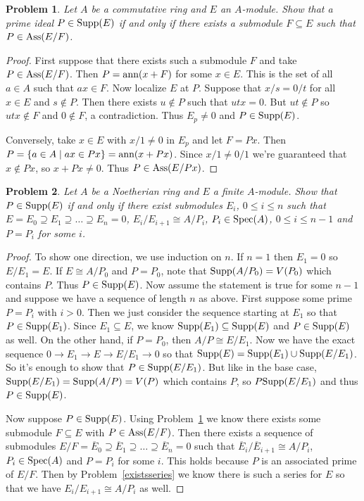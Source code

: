 \documentclass{article}
\newcommand{\ass}{\textup{Ass}}
\newcommand{\supp}{\textup{Supp}}
\newcommand{\ann}{\textup{ann}}
\newcommand{\spec}{\textup{Spec}}
\newtheorem{problem}{Problem}
\begin{document}
\begin{problem}
\label{existssub}
Let $A$ be a commutative ring and $E$ an $A$-module. Show that a prime ideal $P \in \supp(E)$ if and only if there exists a submodule $F \subseteq E$ such that $P \in \ass(E/F)$.
\end{problem}
\begin{proof}
First suppose that there exists such a submodule $F$ and take $P \in \ass(E/F)$. Then $P = \ann(x + F)$ for some $x \in E$. This is the set of all $a \in A$ such that $ax \in F$. Now localize $E$ at $P$. Suppose that $x/s = 0/t$ for all $x \in E$ and $s \notin P$. Then there exists $u \notin P$ such that $utx = 0$. But $ut \notin P$ so $utx \notin F$ and $0 \notin F$, a contradiction. Thus $E_p \neq 0$ and $P \in \supp(E)$.

Conversely, take $x \in E$ with $x/1 \neq 0$ in $E_p$ and let $F = Px$. Then $P = \{a \in A \mid ax \in Px\} = \ann(x + Px)$. Since $x/1 \neq 0/1$ we're guaranteed that $x \notin Px$, so $x + Px \neq 0$. Thus $P \in \ass(E/Px)$.
\end{proof}

\begin{problem}
Let $A$ be a Noetherian ring and $E$ a finite $A$-module. Show that $P \in \supp(E)$ if and only if there exist submodules $E_i$, $0 \leq i \leq n$ such that $E = E_0 \supseteq E_1 \supseteq \dots \supseteq E_n = 0$, $E_i/E_{i+1} \cong A/P_i$, $P_i \in \spec(A)$, $0 \leq i \leq n-1$ and $P = P_i$ for some $i$.
\end{problem}
\begin{proof}
To show one direction, we use induction on $n$. If $n = 1$ then $E_1 = 0$ so $E/E_1 = E$. If $E \cong A/P_0$ and $P = P_0$, note that $\supp(A/P_0) = V(P_0)$ which contains $P$. Thus $P \in \supp(E)$. Now assume the statement is true for some $n-1$ and suppose we have a sequence of length $n$ as above. First suppose some prime $P = P_i$ with $i > 0$. Then we just consider the sequence starting at $E_1$ so that $P \in \supp(E_1)$. Since $E_1 \subseteq E$, we know $\supp(E_1) \subseteq \supp(E)$ and $P \in \supp(E)$ as well. On the other hand, if $P = P_0$, then $A/P \cong E/E_1$. Now we have the exact sequence $0 \to E_1 \to E \to E/E_1 \to 0$ so that $\supp(E) = \supp(E_1) \cup \supp(E/E_1)$. So it's enough to show that $P \in \supp(E/E_1)$. But like in the base case, $\supp(E/E_1) = \supp(A/P) = V(P)$ which contains $P$, so $P \supp(E/E_1)$ and thus $P \in \supp(E)$.

Now suppose $P \in \supp(E)$. Using Problem~\ref{existssub} we know there exists some submodule $F \subseteq E$ with $P \in \ass(E/F)$. Then there exists a sequence of submodules $E/F = \overline{E}_0 \supseteq \overline{E}_1 \supseteq \dots \supseteq \overline{E}_n = 0$ such that $\overline{E}_i/\overline{E}_{i+1} \cong A/P_i$, $P_i \in \spec(A)$ and $P = P_i$ for some $i$. This holds because $P$ is an associated prime of $E/F$. Then by Problem~\ref{existsseries} we know there is such a series for $E$ so that we have $E_i/E_{i+1} \cong A/P_i$ as well.
\end{proof}
\end{document}
